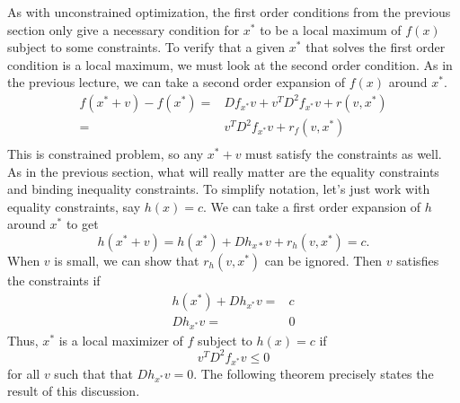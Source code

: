 \documentclass[12pt,reqno]{amsart}
\theoremstyle{definition}
\begin{document}
As with unconstrained optimization, the first order conditions from
the previous section only give a necessary condition for $x^*$ to be a
local maximum of $f(x)$ subject to some constraints. To verify that a
given $x^*$ that solves the first order condition is a local maximum,
we must look at the second order condition. As in the previous
lecture, we can take a second order expansion of $f(x)$ around $x^*$. 
\begin{align*}
  f(x^*+v) - f(x^*) = & Df_{x^*} v + v^T D^2 f_{x^*}
  v + r(v,x^*) \\
  = & v^T D^2 f_{x^*} v + r_f(v,x^*) \\
\end{align*}
This is constrained problem, so any $x^* + v$ must satisfy the
constraints as well. As in the previous section, what will really
matter are the equality constraints and binding inequality
constraints. To simplify notation, let's just work with equality
constraints, say $h(x)=c$. We can take a first order expansion of $h$
around $x^*$ to get
\[ h(x^* + v) = h(x^*) + Dh_{x*} v + r_h(v,x^*) = c. \]
When $v$ is small, we can show that $r_h(v,x^*)$ can be
ignored. Then $v$ satisfies the constraints if
\begin{align*}
  h(x^*) + Dh_{x^*} v = & c \\
  Dh_{x^*} v = & 0
\end{align*}
Thus, $x^*$ is a local maximizer of $f$ subject to $h(x) = c$ if
\[ v^T D^2 f_{x^*} v \leq 0 \] for all $v$ such that that $Dh_{x^*} v
= 0$. The following theorem precisely states the result of this
discussion.
\end{document}
